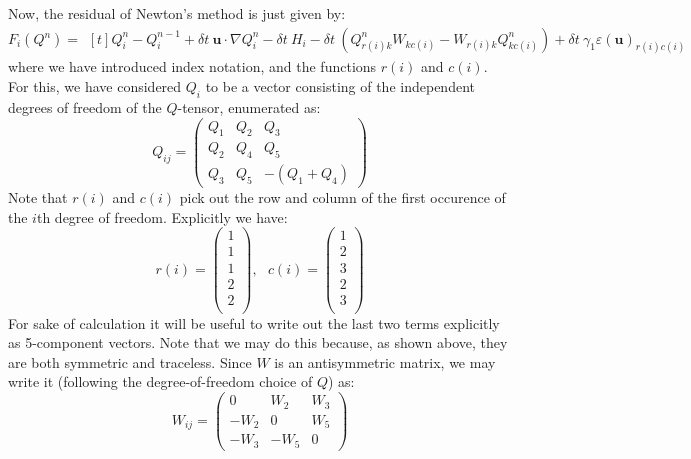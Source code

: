 \documentclass[reqno]{article}
\begin{document}
  Now, the residual of Newton's method is just given by:
  \begin{equation}
    F_i(Q^n)
    =
    \begin{multlined}[t]
    Q_i^n - Q_i^{n - 1}
    + \delta t \: \mathbf{u} \cdot \nabla Q_i^n
    - \delta t \: H_i
    - \delta t \: \left( Q^n_{r(i)k} W_{kc(i)} - W_{r(i)k} Q_{kc(i)}^n \right)
    + \delta t \: \gamma_1 \varepsilon(\mathbf{u})_{r(i)c(i)}
    \end{multlined}
  \end{equation}
  where we have introduced index notation, and the functions $r(i)$ and $c(i)$.
  For this, we have considered $Q_i$ to be a vector consisting of the
  independent degrees of freedom of the $Q$-tensor, enumerated as:
  \begin{equation}
    Q_{ij}
    =
    \begin{pmatrix}
      Q_1 &Q_2 &Q_3 \\
      Q_2 &Q_4 &Q_5 \\
      Q_3 &Q_5 &-(Q_1 + Q_4)
    \end{pmatrix}
  \end{equation}
  Note that $r(i)$ and $c(i)$ pick out the row and column of the first occurence
  of the $i$th degree of freedom.
  Explicitly we have:
  \begin{equation}
    r(i)
    =
    \begin{pmatrix}
      1 \\
      1 \\
      1 \\
      2 \\
      2 \\
    \end{pmatrix}
    ,
    \:\:\:
    c(i)
    =
    \begin{pmatrix}
      1 \\
      2 \\
      3 \\
      2 \\
      3 \\
    \end{pmatrix}
  \end{equation}
  For sake of calculation it will be useful to write out the last two terms
  explicitly as 5-component vectors.
  Note that we may do this because, as shown above, they are both symmetric and
  traceless.
  Since $W$ is an antisymmetric matrix, we may write it (following the
  degree-of-freedom choice of $Q$) as:
  \begin{equation}
    W_{ij}
    =
    \begin{pmatrix}
      0 &W_2 &W_3 \\
      -W_2 &0 &W_5 \\
      -W_3 &-W_5 &0
    \end{pmatrix}
  \end{equation}
\end{document}
